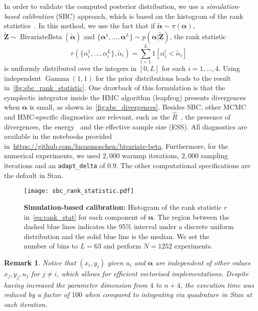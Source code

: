 \documentclass[a4paper, notitlepage, 10pt]{article}
\newcommand{\dd}{\boldsymbol{Z}}
\newcommand{\parameter}{\boldsymbol{\alpha}}
\newtheorem{remark}{Remark}[]
\theoremstyle{definition}
\begin{document}
In order to validate the computed posterior distribution, we use a {\em simulation-based calibration\/} (SBC) approach, which is based on the histogram of the rank statistics~\cite[]{talts2018validating}.
In this method, we use the fact that if $\tilde{\parameter} \sim \pi(\parameter)$, $\tilde{\dd} \sim \operatorname{BivariateBeta}(\tilde{\parameter})$ and $\{\parameter^1, \dots, \parameter^L\} \sim p(\parameter|\tilde{\dd})$, the rank statistic
\begin{equation}
    \label{eq:rank_stat}
    r(\{\alpha^1_i, \dots, \alpha^L_i\}, \tilde{\alpha}_i) = \sum_{l=1}^L 1[\alpha^l_i < \tilde{\alpha}_i]
\end{equation}
is uniformly distributed over the integers in $[0, L]$ for each $i=1,\dots,4$.
Using independent $\operatorname{Gamma}(1,1)$ for the prior distributions leads to the result in~\autoref{fig:sbc_rank_statistic}.
One drawback of this formulation is that the symplectic integrator inside the HMC algorithm (leapfrog) presents divergences when $\parameter$ is small, as shown in~\autoref{fig:sbc_divergences}.
Besides SBC, other MCMC and HMC-specific diagnostics are relevant, such as the $\hat{R}$~\citep{gelman1992inference}, the presence of divergences, the energy~\cite[]{betancourt2016diagnosing} and the effective sample size (ESS).
All diagnostics are available in the notebooks provided in~\url{https://github.com/lucasmoschen/bivariate-beta}.
Furthermore, for the numerical experiments, we used $2,000$ warmup iterations, $2,000$ sampling iterations and an {\tt adapt\_delta} of $0.9$.
The other computational specifications are the default in Stan.

\begin{figure}
    \centering
    \texttt{[image: sbc\_rank\_statistic.pdf]}
    \caption{{\bf Simulation-based calibration:} Histogram of the rank statistic $r$ in~\eqref{eq:rank_stat} for each component of $\parameter$.
    The region between the dashed blue lines indicates the 95\% interval under a discrete uniform distribution and the solid blue line is the median.
    We set the number of bins to $L=63$ and perform $N=1252$ experiments.}\label{fig:sbc_rank_statistic}
\end{figure}

\begin{remark}
    Notice that $(x_i, y_i)$ given $u_i$ and $\boldsymbol\alpha$ are independent of other values $x_j, y_j, u_j$ for $j \neq i$, which allows for efficient vectorised implementations.  
    Despite having increased the parameter dimension from $4$ to $n+4$, the execution time was reduced by a factor of $100$ when compared to integrating via quadrature in Stan at each iteration.
\end{remark}
\end{document}

